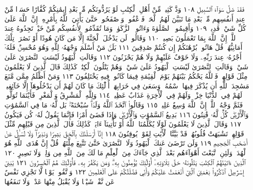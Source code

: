 فَقَدْ ضَلَّ سَوَآءَ ٱلسَّبِيلِ ١٠٨ وَدَّ كَثِيرࣱ مِّنْ أَهْلِ ٱلْكِتَٰبِ
لَوْ يَرُدُّونَكُم مِّنۢ بَعْدِ إِيمَٰنِكُمْ كُفَّارًا حَسَدࣰا
مِّنْ عِندِ أَنفُسِهِم مِّنۢ بَعْدِ مَا تَبَيَّنَ لَهُمُ ٱلْحَقُّۖ فَٱعْفُوا۟
وَٱصْفَحُوا۟ حَتَّىٰ يَأْتِيَ ٱللَّهُ بِأَمْرِهِۦٓۗ إِنَّ ٱللَّهَ عَلَىٰ كُلِّ شَيْءࣲ
قَدِيرࣱ ١٠٩ وَأَقِيمُوا۟ ٱلصَّلَوٰةَ وَءَاتُوا۟ ٱلزَّكَوٰةَۚ وَمَا تُقَدِّمُوا۟
لِأَنفُسِكُم مِّنْ خَيْرࣲ تَجِدُوهُ عِندَ ٱللَّهِۗ إِنَّ ٱللَّهَ بِمَا تَعْمَلُونَ
بَصِيرࣱ ١١٠ وَقَالُوا۟ لَن يَدْخُلَ ٱلْجَنَّةَ إِلَّا مَن كَانَ هُودًا
أَوْ نَصَٰرَىٰۗ تِلْكَ أَمَانِيُّهُمْۗ قُلْ هَاتُوا۟ بُرْهَٰنَكُمْ إِن كُنتُمْ
صَٰدِقِينَ ١١١ بَلَىٰۚ مَنْ أَسْلَمَ وَجْهَهُۥ لِلَّهِ وَهُوَ مُحْسِنࣱ فَلَهُۥٓ
أَجْرُهُۥ عِندَ رَبِّهِۦ وَلَا خَوْفٌ عَلَيْهِمْ وَلَا هُمْ يَحْزَنُونَ ١١٢
وَقَالَتِ ٱلْيَهُودُ لَيْسَتِ ٱلنَّصَٰرَىٰ عَلَىٰ شَيْءࣲ وَقَالَتِ ٱلنَّصَٰرَىٰ
لَيْسَتِ ٱلْيَهُودُ عَلَىٰ شَيْءࣲ وَهُمْ يَتْلُونَ ٱلْكِتَٰبَۗ كَذَٰلِكَ
قَالَ ٱلَّذِينَ لَا يَعْلَمُونَ مِثْلَ قَوْلِهِمْۚ فَٱللَّهُ يَحْكُمُ بَيْنَهُمْ
يَوْمَ ٱلْقِيَٰمَةِ فِيمَا كَانُوا۟ فِيهِ يَخْتَلِفُونَ ١١٣ وَمَنْ أَظْلَمُ مِمَّن
مَّنَعَ مَسَٰجِدَ ٱللَّهِ أَن يُذْكَرَ فِيهَا ٱسْمُهُۥ وَسَعَىٰ فِي خَرَابِهَآۚ
أُو۟لَٰٓئِكَ مَا كَانَ لَهُمْ أَن يَدْخُلُوهَآ إِلَّا خَآئِفِينَۚ لَهُمْ فِي
ٱلدُّنْيَا خِزْيࣱ وَلَهُمْ فِي ٱلْأٓخِرَةِ عَذَابٌ عَظِيمࣱ ١١٤ وَلِلَّهِ ٱلْمَشْرِقُ
وَٱلْمَغْرِبُۚ فَأَيْنَمَا تُوَلُّوا۟ فَثَمَّ وَجْهُ ٱللَّهِۚ إِنَّ ٱللَّهَ وَٰسِعٌ عَلِيمࣱ ١١٥
وَقَالُوا۟ ٱتَّخَذَ ٱللَّهُ وَلَدࣰاۗ سُبْحَٰنَهُۥۖ بَل لَّهُۥ مَا فِي ٱلسَّمَٰوَٰتِ
وَٱلْأَرْضِۖ كُلࣱّ لَّهُۥ قَٰنِتُونَ ١١٦ بَدِيعُ ٱلسَّمَٰوَٰتِ وَٱلْأَرْضِۖ
وَإِذَا قَضَىٰٓ أَمْرࣰا فَإِنَّمَا يَقُولُ لَهُۥ كُن فَيَكُونُ ١١٧ وَقَالَ
ٱلَّذِينَ لَا يَعْلَمُونَ لَوْلَا يُكَلِّمُنَا ٱللَّهُ أَوْ تَأْتِينَآ ءَايَةࣱۗ
كَذَٰلِكَ قَالَ ٱلَّذِينَ مِن قَبْلِهِم مِّثْلَ قَوْلِهِمْۘ تَشَٰبَهَتْ
قُلُوبُهُمْۗ قَدْ بَيَّنَّا ٱلْأٓيَٰتِ لِقَوْمࣲ يُوقِنُونَ ١١٨ إِنَّآ أَرْسَلْنَٰكَ
بِٱلْحَقِّ بَشِيرࣰا وَنَذِيرࣰاۖ وَلَا تُسْـَٔلُ عَنْ أَصْحَٰبِ ٱلْجَحِيمِ ١١٩
وَلَن تَرْضَىٰ عَنكَ ٱلْيَهُودُ وَلَا ٱلنَّصَٰرَىٰ حَتَّىٰ تَتَّبِعَ مِلَّتَهُمْۗ قُلْ
إِنَّ هُدَى ٱللَّهِ هُوَ ٱلْهُدَىٰۗ وَلَئِنِ ٱتَّبَعْتَ أَهْوَآءَهُم بَعْدَ ٱلَّذِي
جَآءَكَ مِنَ ٱلْعِلْمِ مَا لَكَ مِنَ ٱللَّهِ مِن وَلِيࣲّ وَلَا نَصِيرٍ ١٢٠ ٱلَّذِينَ
ءَاتَيْنَٰهُمُ ٱلْكِتَٰبَ يَتْلُونَهُۥ حَقَّ تِلَاوَتِهِۦٓ أُو۟لَٰٓئِكَ يُؤْمِنُونَ بِهِۦۗ وَمَن
يَكْفُرْ بِهِۦ فَأُو۟لَٰٓئِكَ هُمُ ٱلْخَٰسِرُونَ ١٢١ يَٰبَنِيٓ إِسْرَٰٓءِيلَ ٱذْكُرُوا۟ نِعْمَتِيَ
ٱلَّتِيٓ أَنْعَمْتُ عَلَيْكُمْ وَأَنِّي فَضَّلْتُكُمْ عَلَى ٱلْعَٰلَمِينَ ١٢٢ وَٱتَّقُوا۟ يَوْمࣰا
لَّا تَجْزِي نَفْسٌ عَن نَّفْسࣲ شَيْـࣰٔا وَلَا يُقْبَلُ مِنْهَا عَدْلࣱ وَلَا تَنفَعُهَا
